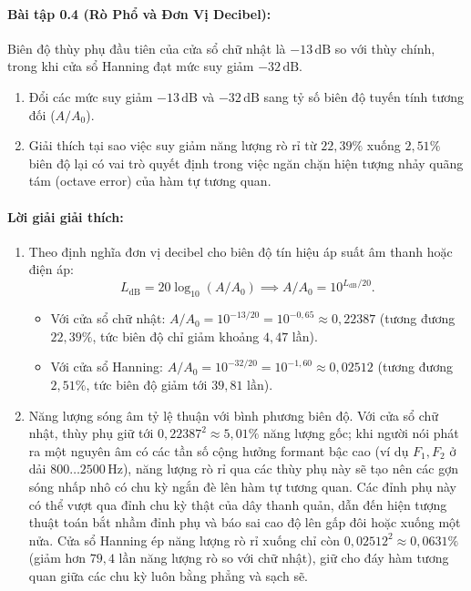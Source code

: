 \paragraph{Bài tập 0.4 (Rò Phổ và Đơn Vị Decibel):} Biên độ thùy phụ đầu tiên của cửa sổ chữ nhật là $-13\,\text{dB}$ so với thùy chính, trong khi cửa sổ Hanning đạt mức suy giảm $-32\,\text{dB}$.
\begin{enumerate}[label=\alph*)]
    \item Đổi các mức suy giảm $-13\,\text{dB}$ và $-32\,\text{dB}$ sang tỷ số biên độ tuyến tính tương đối ($A / A_0$).
    \item Giải thích tại sao việc suy giảm năng lượng rò rỉ từ $22{,}39\%$ xuống $2{,}51\%$ biên độ lại có vai trò quyết định trong việc ngăn chặn hiện tượng nhảy quãng tám (octave error) của hàm tự tương quan.
\end{enumerate}

\paragraph{Lời giải giải thích:}
\begin{enumerate}[label=\alph*)]
    \item Theo định nghĩa đơn vị decibel cho biên độ tín hiệu áp suất âm thanh hoặc điện áp:
    \[
    L_{\mathrm{dB}} = 20 \log_{10}(A / A_0) \implies A / A_0 = 10^{L_{\mathrm{dB}} / 20}.
    \]
    \begin{itemize}
        \item Với cửa sổ chữ nhật: $A / A_0 = 10^{-13 / 20} = 10^{-0{,}65} \approx 0{,}22387$ (tương đương $22{,}39\%$, tức biên độ chỉ giảm khoảng $4{,}47$ lần).
        \item Với cửa sổ Hanning: $A / A_0 = 10^{-32 / 20} = 10^{-1{,}60} \approx 0{,}02512$ (tương đương $2{,}51\%$, tức biên độ giảm tới $39{,}81$ lần).
    \end{itemize}
    \item Năng lượng sóng âm tỷ lệ thuận với bình phương biên độ. Với cửa sổ chữ nhật, thùy phụ giữ tới $0{,}22387^2 \approx 5{,}01\%$ năng lượng gốc; khi người nói phát ra một nguyên âm có các tần số cộng hưởng formant bậc cao (ví dụ $F_1, F_2$ ở dải $800 \ldots 2500\,\text{Hz}$), năng lượng rò rỉ qua các thùy phụ này sẽ tạo nên các gợn sóng nhấp nhô có chu kỳ ngắn đè lên hàm tự tương quan. Các đỉnh phụ này có thể vượt qua đỉnh chu kỳ thật của dây thanh quản, dẫn đến hiện tượng thuật toán bắt nhầm đỉnh phụ và báo sai cao độ lên gấp đôi hoặc xuống một nửa. Cửa sổ Hanning ép năng lượng rò rỉ xuống chỉ còn $0{,}02512^2 \approx 0{,}0631\%$ (giảm hơn $79{,}4$ lần năng lượng rò so với chữ nhật), giữ cho đáy hàm tương quan giữa các chu kỳ luôn bằng phẳng và sạch sẽ.
\end{enumerate}
